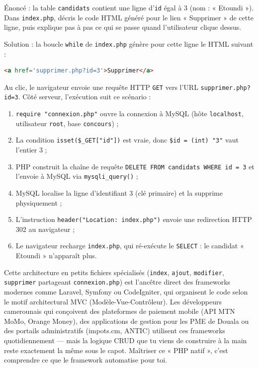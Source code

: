 \documentclass[11pt]{article}
\newcommand{\cle}[1]{{\popxbold\color{popdark}#1}}
\begin{document}
\begin{exoresolu}
Énoncé : la table \texttt{candidats} contient une ligne d'\texttt{id} égal à 3 (nom : « Etoundi »). Dans \texttt{index.php}, décris le code HTML généré pour le lien « Supprimer » de cette ligne, puis explique pas à pas ce qui se passe quand l'utilisateur clique dessus.

\tcblower
Solution : la boucle \texttt{while} de \texttt{index.php} génère pour cette ligne le HTML suivant :
\begin{lstlisting}[language=HTML]
<a href='supprimer.php?id=3'>Supprimer</a>
\end{lstlisting}
Au clic, le navigateur envoie une requête HTTP \texttt{GET} vers l'URL \texttt{supprimer.php?id=3}. Côté serveur, l'exécution suit ce scénario :
\begin{enumerate}
\item \texttt{require "connexion.php"} ouvre la connexion à MySQL (hôte \texttt{localhost}, utilisateur \texttt{root}, base \texttt{concours}) ;
\item La condition \texttt{isset(\$\_GET["id"])} est vraie, donc \texttt{\$id = (int) "3"} vaut l'entier $3$ ;
\item PHP construit la chaîne de requête \texttt{DELETE FROM candidats WHERE id = 3} et l'envoie à MySQL via \texttt{mysqli\_query()} ;
\item MySQL localise la ligne d'identifiant 3 (clé primaire) et la supprime physiquement ;
\item L'instruction \texttt{header("Location: index.php")} envoie une redirection HTTP 302 au navigateur ;
\item Le navigateur recharge \texttt{index.php}, qui ré-exécute le \texttt{SELECT} : le candidat « Etoundi » n'apparaît plus.
\end{enumerate}
\end{exoresolu}

\begin{savaistu}
Cette architecture en petits fichiers spécialisés (\texttt{index}, \texttt{ajout}, \texttt{modifier}, \texttt{supprimer} partageant \texttt{connexion.php}) est l'ancêtre direct des \cle{frameworks} modernes comme Laravel, Symfony ou CodeIgniter, qui organisent le code selon le motif architectural MVC (Modèle-Vue-Contrôleur). Les développeurs camerounais qui conçoivent des plateformes de paiement mobile (API MTN MoMo, Orange Money), des applications de gestion pour les PME de Douala ou des portails administratifs (impots.cm, ANTIC) utilisent ces frameworks quotidiennement — mais la logique CRUD que tu viens de construire à la main reste exactement la même sous le capot. Maîtriser ce « PHP natif », c'est comprendre ce que le framework automatise pour toi.
\end{savaistu}
\end{document}
